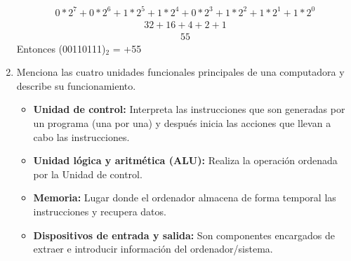 \documentclass{article}
\begin{document}
\begin{enumerate}
    \begin{align*}
        0 * 2^7 + 0 * 2^6 + 1 * 2^5 + 1 * 2^4 + 0 * 2^3 + 1 * 2^2 + 1 * 2^1 + 1 * 2^0
    \end{align*}
    \begin{align*}
        32 + 16 + 4 + 2 + 1
    \end{align*}
    \begin{align*}
        55
    \end{align*}
    Entonces (00110111)$_2$ = +55
    \item Menciona las cuatro unidades funcionales principales de una computadora y describe su funcionamiento.
    \begin{itemize}
        \item \textbf{Unidad de control:} Interpreta las instrucciones que son generadas por un programa (una  por una) y después inicia las acciones que llevan a cabo las instrucciones.
        \item \textbf{Unidad lógica y aritmética (ALU):} Realiza la operación ordenada por la Unidad de control.
        \item \textbf{Memoria: } Lugar donde el ordenador almacena de forma temporal las instrucciones y recupera datos. 
        \item \textbf{Dispositivos de entrada y salida: } Son componentes encargados de extraer e introducir información del ordenador/sistema.
    \end{itemize}
    

\end{enumerate}
\end{document}
